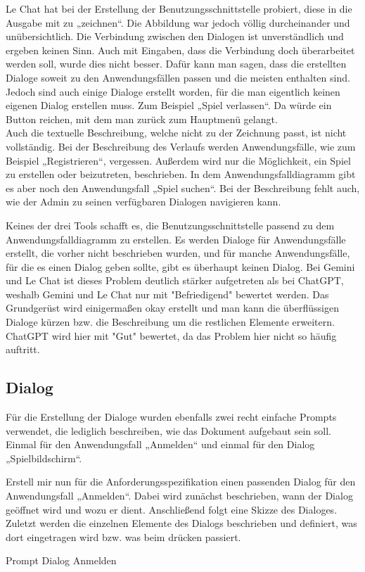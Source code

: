 Le Chat hat bei der Erstellung der Benutzungsschnittstelle probiert, diese in die Ausgabe mit zu „zeichnen“. Die Abbildung war jedoch 
völlig durcheinander und unübersichtlich. Die Verbindung zwischen den Dialogen ist unverständlich und ergeben keinen Sinn. Auch mit 
Eingaben, dass die Verbindung doch überarbeitet werden soll, wurde dies nicht besser. Dafür kann man sagen, dass die erstellten Dialoge 
soweit zu den Anwendungsfällen passen und die meisten enthalten sind. Jedoch sind auch einige Dialoge erstellt worden, für die man 
eigentlich keinen eigenen Dialog erstellen muss. Zum Beispiel „Spiel verlassen“. Da würde ein Button reichen, mit dem man zurück zum 
Hauptmenü gelangt.\\
Auch die textuelle Beschreibung, welche nicht zu der Zeichnung passt, ist nicht vollständig. Bei der Beschreibung des Verlaufs werden 
Anwendungsfälle, wie zum Beispiel „Registrieren“, vergessen. Außerdem wird nur die Möglichkeit, ein Spiel zu erstellen oder beizutreten, 
beschrieben. In dem Anwendungsfalldiagramm gibt es aber noch den Anwendungsfall „Spiel suchen“. Bei der Beschreibung fehlt auch, wie der 
Admin zu seinen verfügbaren Dialogen navigieren kann.

Keines der drei Tools schafft es, die Benutzungsschnittstelle passend zu dem Anwendungsfalldiagramm zu erstellen. Es werden Dialoge für 
Anwendungsfälle erstellt, die vorher nicht beschrieben wurden, und für manche Anwendungsfälle, für die es einen Dialog geben sollte, gibt 
es überhaupt keinen Dialog. Bei Gemini und Le Chat ist dieses Problem deutlich stärker aufgetreten als bei ChatGPT, weshalb Gemini und 
Le Chat nur mit "Befriedigend" bewertet werden. Das Grundgerüst wird einigermaßen okay erstellt und man kann die überflüssigen Dialoge 
kürzen bzw. die Beschreibung um die restlichen Elemente erweitern. ChatGPT wird hier mit "Gut" bewertet, da das Problem hier nicht so 
häufig auftritt.

\subsection*{Dialog}

Für die Erstellung der Dialoge wurden ebenfalls zwei recht einfache Prompts verwendet, die lediglich beschreiben, wie das Dokument aufgebaut 
sein soll. Einmal für den Anwendungsfall „Anmelden“ und einmal für den Dialog „Spielbildschirm“.

\begin{prompt}[H]
    \begin{tcolorbox}[colback=gray!20, colframe=gray!20, boxrule=0pt, sharp corners] 
        Erstell mir nun für die Anforderungsspezifikation einen passenden Dialog für den Anwendungsfall „Anmelden“. Dabei wird zunächst 
        beschrieben, wann der Dialog geöffnet wird und wozu er dient. Anschließend folgt eine Skizze des Dialoges. Zuletzt werden die 
        einzelnen Elemente des Dialogs beschrieben und definiert, was dort eingetragen wird bzw. was beim drücken passiert.
        \vfill
    \end{tcolorbox}
    \caption{Prompt Dialog Anmelden}
    \label{Prompt Dialog Anmelden}
\end{prompt}

